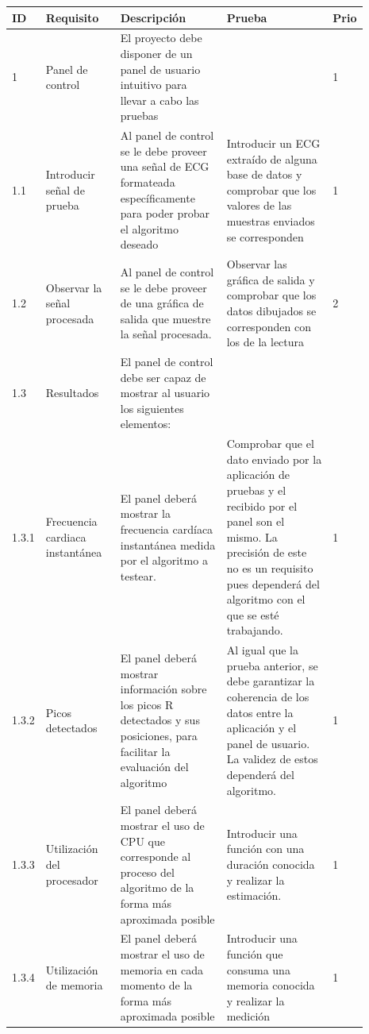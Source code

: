    \begin{scriptsize}
    \begin{longtable}{|p{0.05\linewidth}|p{0.21\linewidth}|p{0.3\linewidth}|p{0.3\linewidth}|p{0.03\linewidth}|}
        \hline
        ID & Requisito & Descripción & Prueba & Prio \\ \hline
        \endfirsthead
        \endhead
        \hline
        \endfoot
        \endlastfoot
        1 & Panel de control & El proyecto debe disponer de un panel de usuario intuitivo para llevar a cabo las pruebas &  & 1 \\ \hline
        1.1 & Introducir señal de prueba & Al panel de control se le debe proveer una señal de ECG formateada específicamente para poder probar el algoritmo deseado & Introducir un ECG extraído de alguna base de datos y comprobar que los valores de las muestras enviados se corresponden & 1 \\ \hline
        1.2     & Observar la señal procesada & Al panel de control se le debe proveer de una gráfica de salida que muestre la señal procesada. & Observar las gráfica de salida y comprobar que los datos dibujados se corresponden con los de la lectura & 2 \\ \hline 
        1.3     & Resultados & El panel de control debe ser capaz de mostrar al usuario los siguientes elementos: &  &  \\ \hline
        1.3.1   & Frecuencia cardiaca instantánea & El panel deberá mostrar la frecuencia cardíaca instantánea medida por el algoritmo a testear. & Comprobar que el dato enviado por la aplicación de pruebas y el recibido por el panel son el mismo. La precisión de este no es un requisito pues dependerá del algoritmo con el que se esté trabajando. & 1 \\ \hline
        1.3.2   & Picos detectados & El panel deberá mostrar información sobre los picos R detectados y sus posiciones, para facilitar la evaluación del algoritmo & Al igual que la prueba anterior, se debe garantizar la coherencia de los datos entre la aplicación y el panel de usuario. La validez de estos dependerá del algoritmo. & 1 \\ \hline
        1.3.3   & Utilización del procesador & El panel deberá mostrar el uso de CPU que corresponde al proceso del algoritmo de la forma más aproximada posible & Introducir una función con una duración conocida y realizar la estimación. & 1 \\ \hline
        1.3.4   & Utilización de memoria & El panel deberá mostrar el uso de memoria en cada momento de la forma más aproximada posible & Introducir una función que consuma una memoria conocida y realizar la medición & 1 \\ \hline

\end{longtable}
\end{scriptsize}
